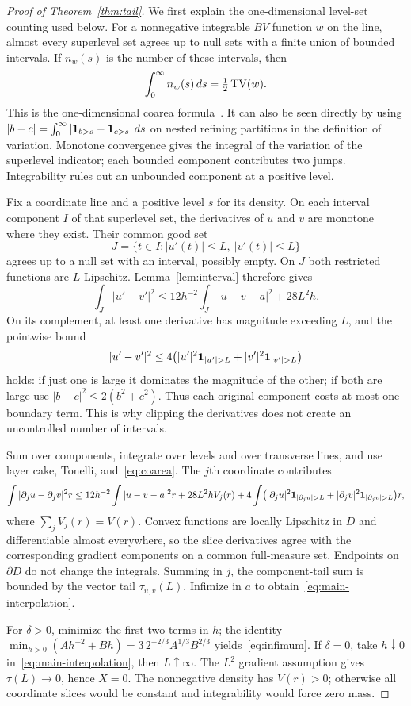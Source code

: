 \documentclass[11pt]{article}
\theoremstyle{remark}\newtheorem{remark}[theorem]{Remark}
\begin{document}
\begin{proof}[Proof of Theorem~\ref{thm:tail}]
We first explain the one-dimensional level-set counting used below. For a nonnegative integrable $BV$ function $w$ on the line, almost every superlevel set agrees up to null sets with a finite union of bounded intervals. If $n_w(s)$ is the number of these intervals, then
\begin{equation}\label{eq:coarea}
 \int_0^\infty n_w(s)\,ds=\tfrac12\operatorname{TV}(w).
\end{equation}
This is the one-dimensional coarea formula~\cite{FR,Fleming}. It can also be seen directly by using
$|b-c|=\int_0^\infty|\mathbf 1_{b>s}-\mathbf 1_{c>s}|\,ds$ on nested refining partitions in the definition of variation. Monotone convergence gives the integral of the variation of the superlevel indicator; each bounded component contributes two jumps. Integrability rules out an unbounded component at a positive level.

Fix a coordinate line and a positive level $s$ for its density. On each interval component $I$ of that superlevel set, the derivatives of $u$ and $v$ are monotone where they exist. Their common good set
\[
 J=\{t\in I:|u'(t)|\le L,\ |v'(t)|\le L\}
\]
agrees up to a null set with an interval, possibly empty. On $J$ both restricted functions are $L$-Lipschitz. Lemma~\ref{lem:interval} therefore gives
\[
 \int_J|u'-v'|^2\le12h^{-2}\int_J|u-v-a|^2+28L^2h.
\]
On its complement, at least one derivative has magnitude exceeding $L$, and the pointwise bound
\[
 |u'-v'|^2\le4\bigl(|u'|^2\ind_{|u'|>L}
                       +|v'|^2\ind_{|v'|>L}\bigr)
\]
holds: if just one is large it dominates the magnitude of the other; if both are large use $|b-c|^2\le2(b^2+c^2)$. Thus each original component costs at most one boundary term. This is why clipping the derivatives does not create an uncontrolled number of intervals.

Sum over components, integrate over levels and over transverse lines, and use layer cake, Tonelli, and~\eqref{eq:coarea}. The $j$th coordinate contributes
\[
 \int|\partial_j u-\partial_j v|^2r
 \le12h^{-2}\int|u-v-a|^2r+28L^2hV_j(r)
 +4\int\bigl(|\partial_j u|^2\ind_{|\partial_j u|>L}
              +|\partial_j v|^2\ind_{|\partial_j v|>L}\bigr)r,
\]
where $\sum_j V_j(r)=V(r)$. Convex functions are locally Lipschitz in $D$ and differentiable almost everywhere, so the slice derivatives agree with the corresponding gradient components on a common full-measure set. Endpoints on $\partial D$ do not change the integrals. Summing in $j$, the component-tail sum is bounded by the vector tail $\tau_{u,v}(L)$. Infimize in $a$ to obtain~\eqref{eq:main-interpolation}.

For $\delta>0$, minimize the first two terms in $h$; the identity
$\min_{h>0}(Ah^{-2}+Bh)=3\,2^{-2/3}A^{1/3}B^{2/3}$ yields~\eqref{eq:infimum}. If $\delta=0$, take $h\downarrow0$ in~\eqref{eq:main-interpolation}, then $L\uparrow\infty$. The $L^2$ gradient assumption gives $\tau(L)\to0$, hence $X=0$. The nonnegative density has $V(r)>0$; otherwise all coordinate slices would be constant and integrability would force zero mass.
\end{proof}
\end{document}
